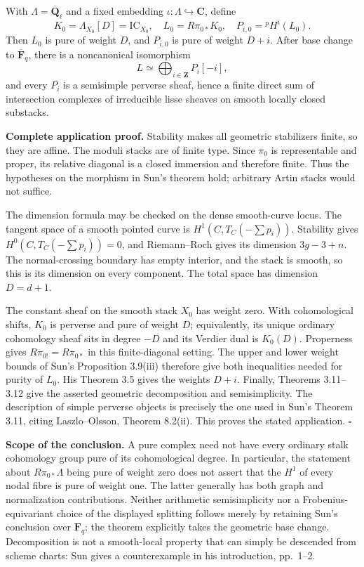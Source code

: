 With \(\Lambda=\overline{\mathbf Q}_\ell\) and a fixed embedding
\(\iota:\Lambda\hookrightarrow\mathbf C\), define \[
K_0=\Lambda_{X_0}[D]=\mathrm{IC}_{X_0},\quad
L_0=R\pi_{0*}K_0,\quad
P_{i,0}={}^p\!H^i(L_0).
\] Then \(L_0\) is pure of weight \(D\), and \(P_{i,0}\) is pure of
weight \(D+i\). After base change to \(\overline{\mathbf F}_q\), there
is a noncanonical isomorphism \[
L\simeq\bigoplus_{i\in\mathbf Z}P_i[-i],
\] and every \(P_i\) is a semisimple perverse sheaf, hence a finite
direct sum of intersection complexes of irreducible lisse sheaves on
smooth locally closed substacks.

\textbf{Complete application proof.} Stability makes all geometric
stabilizers finite, so they are affine. The moduli stacks are of finite
type. Since \(\pi_0\) is representable and proper, its relative diagonal
is a closed immersion and therefore finite. Thus the hypotheses on the
morphism in Sun's theorem hold; arbitrary Artin stacks would not
suffice.

The dimension formula may be checked on the dense smooth-curve locus.
The tangent space of a smooth pointed curve is
\(H^1(C,T_C(-\sum p_i))\). Stability gives \(H^0(C,T_C(-\sum p_i))=0\),
and Riemann--Roch gives its dimension \(3g-3+n\). The normal-crossing
boundary has empty interior, and the stack is smooth, so this is its
dimension on every component. The total space has dimension \(D=d+1\).

The constant sheaf on the smooth stack \(X_0\) has weight zero. With
cohomological shifts, \(K_0\) is perverse and pure of weight \(D\);
equivalently, its unique ordinary cohomology sheaf sits in degree \(-D\)
and its Verdier dual is \(K_0(D)\). Properness gives
\(R\pi_{0!}=R\pi_{0*}\) in this finite-diagonal setting. The upper and
lower weight bounds of Sun's Proposition 3.9(iii) therefore give both
inequalities needed for purity of \(L_0\). His Theorem 3.5 gives the
weights \(D+i\). Finally, Theorems 3.11--3.12 give the asserted
geometric decomposition and semisimplicity. The description of simple
perverse objects is precisely the one used in Sun's Theorem 3.11, citing
Laszlo--Olsson, Theorem 8.2(ii). This proves the stated application.
\(\square\)

\textbf{Scope of the conclusion.} A pure complex need not have every
ordinary stalk cohomology group pure of its cohomological degree. In
particular, the statement about \(R\pi_{0*}\Lambda\) being pure of
weight zero does not assert that the \(H^1\) of every nodal fibre is
pure of weight one. The latter generally has both graph and
normalization contributions. Neither arithmetic semisimplicity nor a
Frobenius-equivariant choice of the displayed splitting follows merely
by retaining Sun's conclusion over \(\mathbf F_q\); the theorem
explicitly takes the geometric base change. Decomposition is not a
smooth-local property that can simply be descended from scheme charts:
Sun gives a counterexample in his introduction, pp.~1--2.

